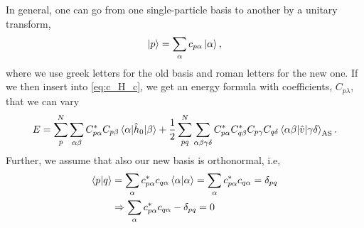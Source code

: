 In general, one can go from one single-particle basis to another by a unitary transform,
\begin{equation}
\ket{p}=\sum_{\alpha}c_{p\alpha}\ket{\alpha},
\end{equation}
where we use greek letters for the old basis and roman letters for the new one. If we then insert into \eqref{eq:c_H_c}, we get an energy formula with coefficients, $C_{p\lambda}$, that we can vary
\begin{equation}
E=\sum_{p}^N\sum_{\alpha\beta}C_{p\alpha}^*C_{p\beta}\mel{\alpha}{\hat{h}_0}{\beta}+\frac{1}{2}
\sum_{pq}^N\sum_{\alpha\beta\gamma\delta}C_{p\alpha}^*C_{q\beta}^*C_{p\gamma}C_{q\delta}\mel{\alpha\beta}{\hat{v}}{\gamma\delta}_{\text{AS}}.
\end{equation}
Further, we assume that also our new basis is orthonormal, i.e,
\begin{align}
\braket{p}{q}&=\sum_{\alpha}c_{p\alpha}^*c_{q\alpha}\braket{\alpha}{\alpha}=\sum_{\alpha}c_{p\alpha}^*c_{q\alpha}=\delta_{pq}\\
&\Rightarrow\sum_{\alpha}c_{p\alpha}^*c_{q\alpha}-\delta_{pq}=0\label{eq:constraint}
\end{align}

